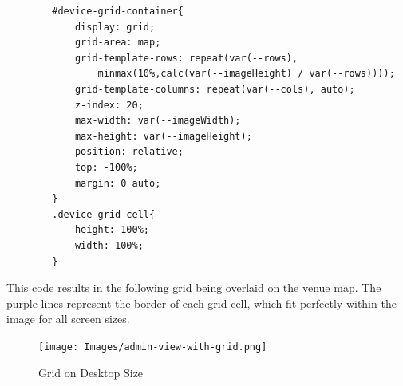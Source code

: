 \documentclass[onecolumn, draftclsnofoot,10pt, compsoc]{IEEEtran}
\begin{document}
        \begin{lstlisting}
        #device-grid-container{
            display: grid;
            grid-area: map;
            grid-template-rows: repeat(var(--rows),
                minmax(10%,calc(var(--imageHeight) / var(--rows))));
            grid-template-columns: repeat(var(--cols), auto);
            z-index: 20;
            max-width: var(--imageWidth);
            max-height: var(--imageHeight);
            position: relative;
            top: -100%;
            margin: 0 auto;
        }
        .device-grid-cell{
            height: 100%;
            width: 100%;
        }
        \end{lstlisting}
        
        This code results in the following grid being overlaid on the venue map. 
        The purple lines represent the border of each grid cell, which fit perfectly within the image for all screen sizes.
        \begin{figure}[H]
            \centering
            \captionsetup{justification=centering,margin=2cm}
            \texttt{[image: Images/admin-view-with-grid.png]}
            \centering\caption{Grid on Desktop Size}
            \label{fig:Change}
        \end{figure}
\end{document}
